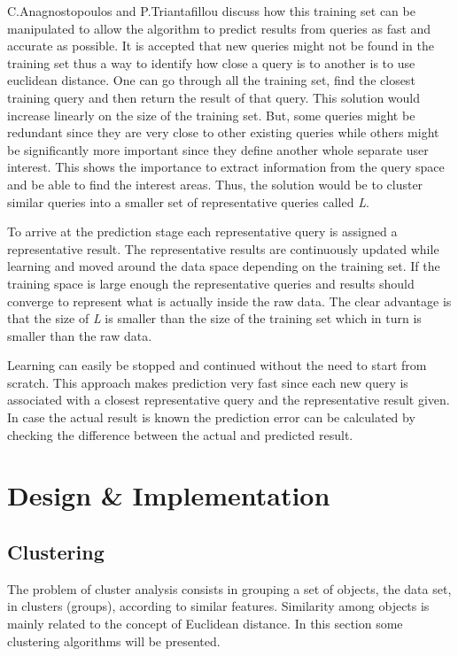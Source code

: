 \documentclass{lmproj}
\begin{document}
C.Anagnostopoulos and P.Triantafillou\cite{learningCount} discuss how this training set can be manipulated to allow the algorithm to predict results from queries as fast and accurate as possible. It is accepted that new queries might not be found in the training set thus a way to identify how close a query is to another is to use euclidean distance. One can go through all the training set, find the closest training query and then return the result of that query. This solution would increase linearly on the size of the training set. But, some queries might be redundant since they are very close to other existing queries while others might be significantly more important since they define another whole separate user interest. This shows the importance to extract information from the query space and be able to find the interest areas. Thus, the solution would be to cluster similar queries into a smaller set of representative queries called \textit{L}.

To arrive at the prediction stage each representative query is assigned a representative result. The representative results are continuously updated while learning and moved around the data space depending on the training set. If the training space is large enough the representative queries and results should converge to represent what is actually inside the raw data. The clear advantage is that the size of \textit{L} is smaller than the size of the training set which in turn is smaller than the raw data.\cite{learningCount}

Learning can easily be stopped and continued without the need to start from scratch. This approach makes prediction very fast since each new query is associated with a closest representative query and the representative result given. In case the actual result is known the prediction error can be calculated by checking the difference between the actual and predicted result.\cite{learningCount}

\chapter{Design \& Implementation}
\label{design}

\section{Clustering}
The problem of cluster analysis consists in grouping a set of objects, the data set, in clusters (groups), according to similar features. Similarity among objects is mainly related to the concept of Euclidean distance. In this section some clustering algorithms will be presented.
\end{document}
